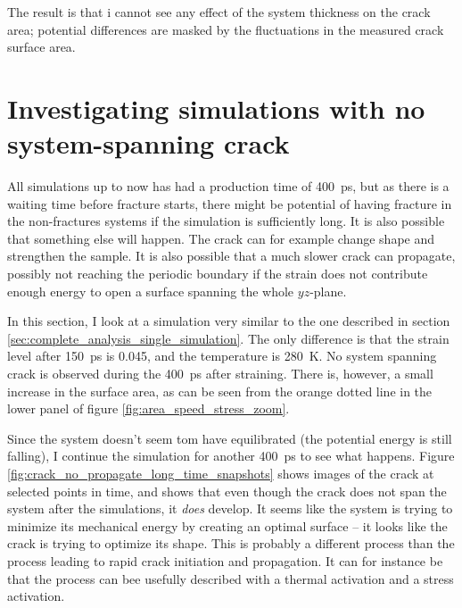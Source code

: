 The result is that i cannot see any effect of the system thickness on the crack area; potential differences are masked by the fluctuations in the measured crack surface area.

\section{Investigating simulations with no system-spanning crack}
All simulations up to now has had a production time of \SI{400}{\pico\second}, but as there is a waiting time before fracture starts, there might be potential of having fracture in the non-fractures systems if the simulation is sufficiently long. It is also possible that something else will happen. The crack can for example change shape and strengthen the sample. It is also possible that a much slower crack can propagate, possibly not reaching the periodic boundary if the strain does not contribute enough energy to open a surface spanning the whole $yz$-plane. 

In this section, I look at a simulation very similar to the one described in section \ref{sec:complete_analysis_single_simulation}. The only difference is that the strain level after \SI{150}{\pico\second} is 0.045, and the temperature is \SI{280}{\kelvin}. No system spanning crack is observed during the \SI{400}{\pico\second} after straining. There is, however, a small increase in the surface area, as can be seen from the orange dotted line in the lower panel of figure \ref{fig:area_speed_stress_zoom}.

Since the system doesn't seem tom have equilibrated (the potential energy is still falling), I continue the simulation for another \SI{400}{\pico\second} to see what happens. Figure \ref{fig:crack_no_propagate_long_time_snapshots} shows images of the crack at selected points in time, and shows that even though the crack does not span the system after the simulations, it \emph{does} develop. It seems like the system is trying to minimize its mechanical energy by creating an optimal surface -- it looks like the crack is trying to optimize its shape. This is probably a different process than the process leading to rapid crack initiation and propagation. It can for instance be that the process can bee usefully described with a thermal activation and a stress activation. 

